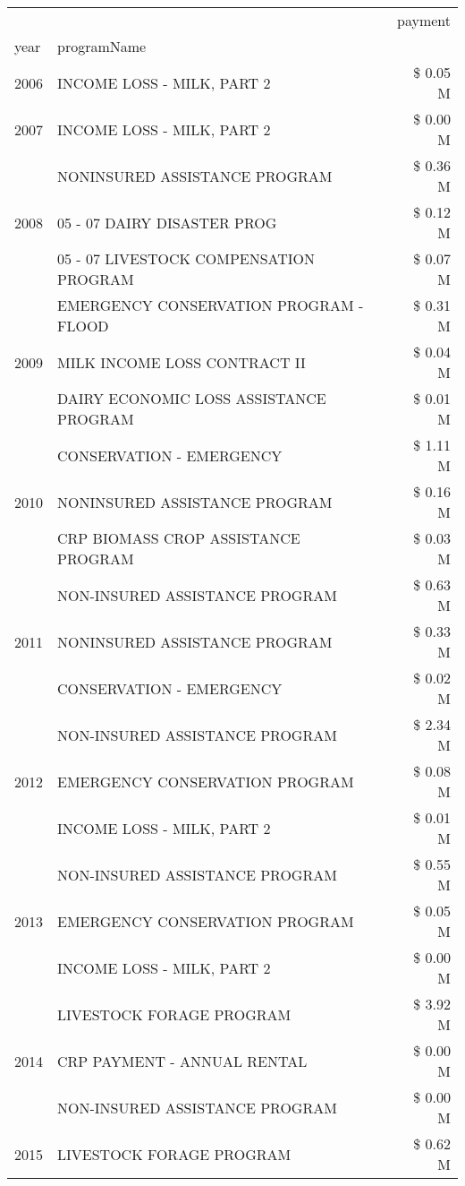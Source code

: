 \begin{tabular}{llr}
\toprule
 &  & payment \\
year & programName &  \\
\midrule
2006 & INCOME LOSS - MILK, PART 2 & \$ 0.05 M \\
\cline{1-3}
2007 & INCOME LOSS - MILK, PART 2 & \$ 0.00 M \\
\cline{1-3}
\multirow[t]{3}{*}{2008} & NONINSURED ASSISTANCE PROGRAM & \$ 0.36 M \\
 & 05 - 07 DAIRY DISASTER PROG & \$ 0.12 M \\
 & 05 - 07 LIVESTOCK COMPENSATION PROGRAM & \$ 0.07 M \\
\cline{1-3}
\multirow[t]{3}{*}{2009} & EMERGENCY CONSERVATION PROGRAM - FLOOD & \$ 0.31 M \\
 & MILK INCOME LOSS CONTRACT II & \$ 0.04 M \\
 & DAIRY ECONOMIC LOSS ASSISTANCE PROGRAM & \$ 0.01 M \\
\cline{1-3}
\multirow[t]{3}{*}{2010} & CONSERVATION - EMERGENCY & \$ 1.11 M \\
 & NONINSURED ASSISTANCE PROGRAM & \$ 0.16 M \\
 & CRP BIOMASS CROP ASSISTANCE PROGRAM & \$ 0.03 M \\
\cline{1-3}
\multirow[t]{3}{*}{2011} & NON-INSURED ASSISTANCE PROGRAM & \$ 0.63 M \\
 & NONINSURED ASSISTANCE PROGRAM & \$ 0.33 M \\
 & CONSERVATION - EMERGENCY & \$ 0.02 M \\
\cline{1-3}
\multirow[t]{3}{*}{2012} & NON-INSURED ASSISTANCE PROGRAM & \$ 2.34 M \\
 & EMERGENCY CONSERVATION PROGRAM & \$ 0.08 M \\
 & INCOME LOSS - MILK, PART 2 & \$ 0.01 M \\
\cline{1-3}
\multirow[t]{3}{*}{2013} & NON-INSURED ASSISTANCE PROGRAM & \$ 0.55 M \\
 & EMERGENCY CONSERVATION PROGRAM & \$ 0.05 M \\
 & INCOME LOSS - MILK, PART 2 & \$ 0.00 M \\
\cline{1-3}
\multirow[t]{3}{*}{2014} & LIVESTOCK FORAGE PROGRAM & \$ 3.92 M \\
 & CRP PAYMENT - ANNUAL RENTAL & \$ 0.00 M \\
 & NON-INSURED ASSISTANCE PROGRAM & \$ 0.00 M \\
\cline{1-3}
\multirow[t]{3}{*}{2015} & LIVESTOCK FORAGE PROGRAM & \$ 0.62 M \\

\end{tabular}
